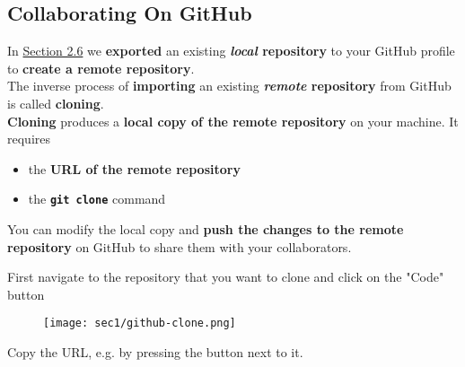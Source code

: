 \subsection{Collaborating On GitHub}\hypertarget{sec1.7}{}


\begin{frame}[fragile]
\emptyframetitle

  In \hyperlink{sec1.6}{Section 2.6} we \textbf{exported} an existing \textbf{\textit{local} repository} to your GitHub profile to \textbf{create a remote repository}.\\[0.35cm]

  The inverse process of \textbf{importing} an existing \textbf{\textit{remote} repository} from GitHub is called \textbf{cloning}.\\[0.35cm]

  \textbf{Cloning} produces a \textbf{local copy of the remote repository} on your machine. It requires 
  \begin{itemize}
    \item the \textbf{URL of the remote repository}
    \item the \textbf{\texttt{git clone}} command\\[0.35cm]
  \end{itemize}

  You can modify the local copy and \textbf{push the changes to the remote repository} on GitHub to share them with your collaborators. 
   
\end{frame}


\begin{frame}[fragile]
\emptyframetitle

  First navigate to the repository that you want to clone and click on the "Code" button

  \begin{figure}[h]
    \texttt{[image: sec1/github-clone.png]}
  \end{figure}

  Copy the URL, e.g. by pressing the button next to it.

\end{frame}


